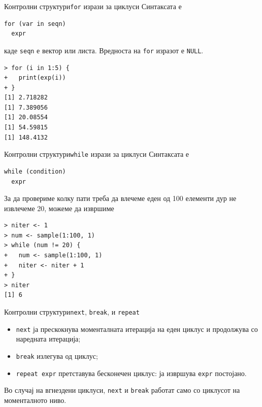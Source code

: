 \documentclass[hyperref={unicode}, xcolor={svgnames, table},
usepdftitle=false]{beamer}
\theoremstyle{remark}
\begin{document}
\begin{frame}[fragile]{Контролни структури}{\texttt{for} изрази за циклуси}
  Синтаксата е
\begin{verbatim}
for (var in seqn)
  expr
\end{verbatim}
  каде \texttt{seqn} е вектор или листа.  Вредноста на
  \texttt{for} изразот е \texttt{NULL}.
\begin{verbatim}
> for (i in 1:5) {
+   print(exp(i))
+ }
[1] 2.718282
[1] 7.389056
[1] 20.08554
[1] 54.59815
[1] 148.4132
\end{verbatim}
\end{frame}

\begin{frame}[fragile]{Контролни структури}{\texttt{while} изрази за циклуси}
  Синтаксата е
\begin{verbatim}
while (condition)
  expr
\end{verbatim}
  За да провериме колку пати треба да влечеме еден од \num{100} елементи дур не
  извлечеме \num{20}, можеме да извршиме
\begin{verbatim}
> niter <- 1
> num <- sample(1:100, 1)
> while (num != 20) {
+   num <- sample(1:100, 1)
+   niter <- niter + 1
+ }
> niter
[1] 6
\end{verbatim}
\end{frame}

\begin{frame}{Контролни структури}{\texttt{next}, \texttt{break},
    и \texttt{repeat}}
  \begin{itemize}
  \item \texttt{next} ја прескокнува моменталната итерација на еден
    циклус и продолжува со наредната итерација;
  \item \texttt{break} излегува од циклус;
  \item \texttt{repeat expr} претставува бесконечен циклус: ја извршува
    \texttt{expr} постојано.
  \end{itemize}

  Во случај на вгнездени циклуси, \texttt{next} и \texttt{break}
  работат само со циклусот на моменталното ниво.
\end{frame}
\end{document}
